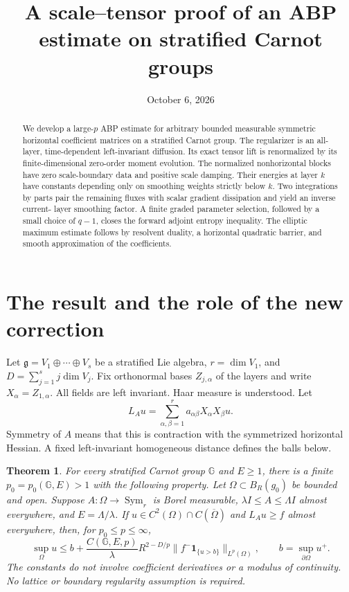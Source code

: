 \documentclass[11pt,a4paper]{amsart}
\title{A scale--tensor proof of an ABP estimate on stratified Carnot groups}
\date{October 6, 2026}
\numberwithin{equation}{section}
\newtheorem{theorem}{Theorem}
\theoremstyle{remark}\newtheorem{remark}[theorem]{Remark}
\newcommand{\G}{\mathbb G}
\newcommand{\Sym}{\operatorname{Sym}}
\newcommand{\norm}[1]{\lVert #1\rVert}
\begin{document}
\begin{abstract}
We develop a large-$p$ ABP estimate for arbitrary bounded measurable symmetric
horizontal coefficient matrices on a stratified Carnot group. The regularizer is
an all-layer, time-dependent left-invariant diffusion. Its exact tensor lift is
renormalized by its finite-dimensional zero-order moment evolution. The
normalized nonhorizontal blocks have zero scale-boundary data and positive
scale damping. Their energies at layer $k$ have constants depending only on
smoothing weights strictly below $k$. Two integrations by parts pair the
remaining fluxes with scalar gradient dissipation and yield an inverse current-
layer smoothing factor. A finite graded parameter selection, followed by a
small choice of $q-1$, closes the forward adjoint entropy inequality. The
elliptic maximum estimate follows by resolvent duality, a horizontal quadratic
barrier, and smooth approximation of the coefficients.
\end{abstract}
\maketitle

\section{The result and the role of the new correction}
Let $\mathfrak g=V_1\oplus\cdots\oplus V_s$ be a stratified Lie algebra,
$r=\dim V_1$, and $D=\sum_{j=1}^s j\dim V_j$. Fix orthonormal bases
$Z_{j,\alpha}$ of the layers and write $X_\alpha=Z_{1,\alpha}$. All fields
are left invariant. Haar measure is understood. Let
\[
 L_Au=\sum_{\alpha,\beta=1}^r a_{\alpha\beta}X_\alpha X_\beta u.
\]
Symmetry of $A$ means that this is contraction with the symmetrized horizontal
Hessian. A fixed left-invariant homogeneous distance defines the balls below.

\begin{theorem}\label{thm:abp}
For every stratified Carnot group $\G$ and $E\ge1$, there is a finite
$p_0=p_0(\G,E)>1$ with the following property. Let $\Omega\subset B_R(g_0)$
be bounded and open. Suppose $A:\Omega\to\Sym_r$ is Borel measurable,
$\lambda I\le A\le\Lambda I$ almost everywhere, and $E=\Lambda/\lambda$.
If $u\in C^2(\Omega)\cap C(\overline\Omega)$ and $L_Au\ge f$ almost
everywhere, then, for $p_0\le p\le\infty$,
\begin{equation}\label{eq:abp}
 \sup_\Omega u\le b+
 \frac{C(\G,E,p)}\lambda R^{2-D/p}
 \norm{f^-\mathbf1_{\{u>b\}}}_{L^p(\Omega)},
 \qquad b=\sup_{\partial\Omega}u^+.
\end{equation}
The constants do not involve coefficient derivatives or a modulus of
continuity. No lattice or boundary regularity assumption is required.
\end{theorem}
\end{document}
